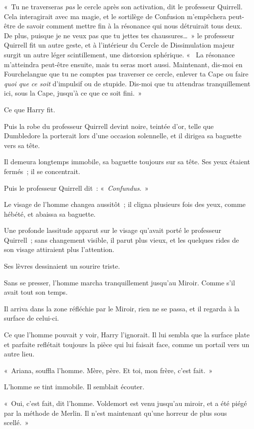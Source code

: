 «~Tu ne traverseras \emph{pas} le cercle après son activation, dit le professeur Quirrell. Cela interagirait avec ma magie, et le sortilège de Confusion m'empêchera peut-être de savoir comment mettre fin à la résonance qui nous détruirait tous deux. De plus, puisque je ne veux pas que tu jettes tes chaussures…~» le professeur Quirrell fit un autre geste, et à l'intérieur du Cercle de Dissimulation majeur surgit un autre léger scintillement, une distorsion sphérique. «~ La résonance m'atteindra peut-être ensuite, mais tu seras mort aussi. Maintenant, dis-moi en Fourchelangue que tu ne comptes pas traverser ce cercle, enlever ta Cape ou faire \emph{quoi que ce soit} d'impulsif ou de stupide. Dis-moi que tu attendras tranquillement ici, sous la Cape, jusqu'à ce que ce soit fini.~»

Ce que Harry fit.

Puis la robe du professeur Quirrell devint noire, teintée d'or, telle que Dumbledore la porterait lors d'une occasion solennelle, et il dirigea sa baguette vers sa tête.

Il demeura longtemps immobile, sa baguette toujours sur sa tête. Ses yeux étaient fermés~; il se concentrait.

Puis le professeur Quirrell dit~: «~\emph{Confundus}.~»

Le visage de l'homme changea aussitôt~; il cligna plusieurs fois des yeux, comme hébété, et abaissa sa baguette.

Une profonde lassitude apparut sur le visage qu'avait porté le professeur Quirrell~; sans changement visible, il parut plus vieux, et les quelques rides de son visage attiraient plus l'attention.

Ses lèvres dessinaient un sourire triste.

Sans se presser, l'homme marcha tranquillement jusqu'au Miroir. Comme s'il avait tout son temps.

Il arriva dans la zone réfléchie par le Miroir, rien ne se passa, et il regarda à la surface de celui-ci.

Ce que l'homme pouvait y voir, Harry l'ignorait. Il lui sembla que la surface plate et parfaite reflétait toujours la pièce qui lui faisait face, comme un portail vers un autre lieu.

«~Ariana, souffla l'homme. Mère, père. Et toi, mon frère, c'est fait.~»

L'homme se tint immobile. Il semblait écouter.

«~Oui, c'est fait, dit l'homme. Voldemort est venu jusqu'au miroir, et a été piégé par la méthode de Merlin. Il n'est maintenant qu'une horreur de plus sous scellé.~»

